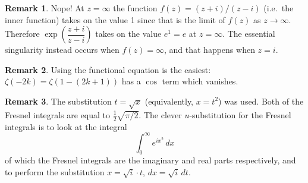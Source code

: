 \documentclass[11pt,oneside]{amsart}
\theoremstyle{definition}
\newtheorem{remark}{Remark}
\begin{document}
\begin{remark} %
  Nope! At $z=\infty$ the function $f(z)=(z+i)/(z-i)$ (i.e.\ the inner function) takes on the value 1 since that is the limit of $f(z)$ as $z\to\infty$. Therefore $\exp\left(\dfrac{z+i}{z-i}\right)$ takes on the value $e^1=e$ at $z=\infty$. The essential singularity instead occurs when $f(z)=\infty$, and that happens when $z=i$.
\end{remark}

\begin{remark} %
  Using the functional equation is the easiest: $\zeta(-2k)=\zeta(1-(2k+1))$ has a $\cos$ term which vanishes.
\end{remark}

\begin{remark} %
  The substitution $t=\sqrt x$ (equivalently, $x=t^2$) was used. Both of the Fresnel integrals are equal to $\frac 12\sqrt{\pi/2}$. The clever $u$-substitution for the Fresnel integrals is to look at the integral
  \[\int_0^\infty e^{ix^2}\,dx\]
  of which the Fresnel integrals are the imaginary and real parts respectively, and to perform the substitution $x=\sqrt i\cdot t$, $dx=\sqrt i\,dt$.
\end{remark}
\end{document}

